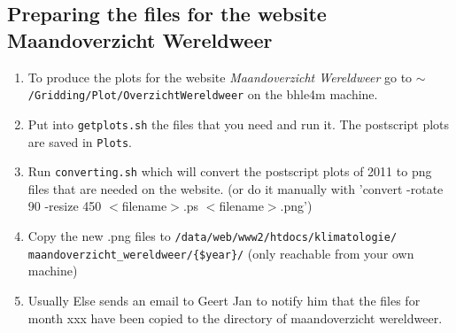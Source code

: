 \documentclass[a4paper]{article}
\begin{document}
\subsection{Preparing the files for the website Maandoverzicht
  Wereldweer}
\begin{enumerate}
\item To produce the plots for the website \textit{Maandoverzicht
    Wereldweer} go to
  \texttt{$\sim$/Gridding/Plot/OverzichtWereldweer} on the bhle4m
  machine.
\item Put into \texttt{getplots.sh} the files that you need and run
  it. The postscript plots are saved in \texttt{Plots}.
\item Run \texttt{converting.sh} which will convert the postscript
  plots of 2011 to png files that are needed on the website. (or do it
  manually with 'convert -rotate 90 -resize 450 $<$filename$>$.ps
  $<$filename$>$.png')
\item Copy the new .png files to
  \texttt{/data/web/www2/htdocs/klimatologie/\\maandoverzicht\_wereldweer/\{\$year\}/}
  (only reachable from your own machine)
\item Usually Else sends an email to Geert Jan to notify him that the
  files for month xxx have been copied to the directory of
  maandoverzicht wereldweer.
\end{enumerate}
\end{document}
